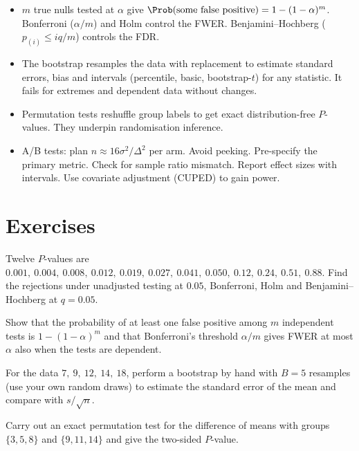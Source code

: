 \begin{summarybox}
\begin{itemize}
  \item $m$ true nulls tested at $\alpha$ give $\Prob(\text{some false positive})=1-(1-\alpha)^m$. Bonferroni ($\alpha/m$) and Holm control the FWER. Benjamini--Hochberg ($p_{(i)}\le iq/m$) controls the FDR.
  \item The bootstrap resamples the data with replacement to estimate standard errors, bias and intervals (percentile, basic, bootstrap-$t$) for any statistic. It fails for extremes and dependent data without changes.
  \item Permutation tests reshuffle group labels to get exact distribution-free $P$-values. They underpin randomisation inference.
  \item A/B tests: plan $n\approx16\sigma^2/\Delta^2$ per arm. Avoid peeking. Pre-specify the primary metric. Check for sample ratio mismatch. Report effect sizes with intervals. Use covariate adjustment (CUPED) to gain power.
\end{itemize}
\end{summarybox}

\section{Exercises}

\begin{exercise}
Twelve $P$-values are $0.001,\ 0.004,\ 0.008,\ 0.012,\ 0.019,\ 0.027,\ 0.041,\ 0.050,\ 0.12,\ 0.24,\ 0.51,\ 0.88$. Find the rejections under unadjusted testing at $0.05$, Bonferroni, Holm and Benjamini--Hochberg at $q=0.05$.
\end{exercise}

\begin{exercise}
Show that the probability of at least one false positive among $m$ independent tests is $1-(1-\alpha)^m$ and that Bonferroni's threshold $\alpha/m$ gives FWER at most $\alpha$ also when the tests are dependent.
\end{exercise}

\begin{exercise}
For the data $7,\ 9,\ 12,\ 14,\ 18$, perform a bootstrap by hand with $B=5$ resamples (use your own random draws) to estimate the standard error of the mean and compare with $s/\sqrt n$.
\end{exercise}

\begin{exercise}
Carry out an exact permutation test for the difference of means with groups $\{3,5,8\}$ and $\{9,11,14\}$ and give the two-sided $P$-value.
\end{exercise}


